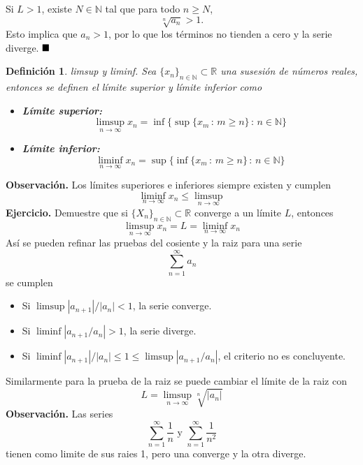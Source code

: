 \documentclass[letterpaper]{book}
\newtheorem{def.}{Definici\'on}[section]
\newcommand{\nat}{\ensuremath{ \mathbb N }}
\newcommand{\exe}{{\noindent \sc \textbf{Ejercicio. }}}
\newcommand{\obs}{{\noindent \sc \textbf{Observación. }}}
\newcommand{\QED}{\ensuremath{\hspace*{0em plus 1fill}\blacksquare}}
\newcommand{\re}{\ensuremath{\mathbb R }}
\begin{document}
Si \(L > 1\), existe \(N \in \mathbb{N}\) tal que para todo \(n \geq N\),
\[
\sqrt[n]{a_n} > 1.
\]
Esto implica que \(a_n > 1\), por lo que los términos no tienden a cero y la serie diverge.
\QED\\
\begin{def.}{limsup y liminf.}
Sea \(\{x_n\}_{n\in\nat}\subset\re\) una susesión de números reales, entonces se definen el límite superior y límite inferior como
\begin{itemize}
\item \textbf{Límite superior:}
    \[\limsup_{n\to\infty}x_n=\inf\{\sup\{x_m\,:\,m\geq n\}\,:\,n\in\nat\}\]
\item \textbf{Límite inferior:}
    \[\liminf_{n\to\infty}x_n=\sup\{\inf\{x_m\,:\,m\geq n\}\,:\,n\in\nat\}\]
\end{itemize}
\end{def.}
\obs Los límites superiores e inferiores siempre existen y cumplen
\[
\liminf_{n\to\infty}x_n\leq\limsup_{n\to\infty}
\]
\exe Demuestre que si \(\{X_n\}_{n\in\nat}\subset\re\) converge a un límite \(L\), entonces
\[
\limsup_{n\to\infty}x_n=L=\liminf_{n\to\infty}x_n
\]
Así se pueden refinar las pruebas del cosiente y la raiz para una serie
\[
\sum_{n=1}^\infty a_n
\]
se cumplen
\begin{itemize}
    \item Si \(\limsup|a_{n+1}|/|a_n| < 1\), la serie converge.
    \item Si \(\liminf|a_{n+1}/a_n| > 1\), la serie diverge.
    \item Si \(\liminf|a_{n+1}|/|a_n| \leq 1\leq\limsup|a_{n+1}/a_n|\), el criterio no es concluyente.
\end{itemize}
\noindent Similarmente para la prueba de la raiz se puede cambiar el límite de la raiz con
\[
L=\limsup_{n\to\infty}\sqrt[n]{|a_n|}
\]
\obs Las series
\[
\sum_{n=1}^{\infty}\frac{1}{n}\text{ y }\sum_{n=1}^{\infty}\frac{1}{n^2}
\]
tienen como limite de sus raies 1, pero una converge y la otra diverge.
\end{document}

